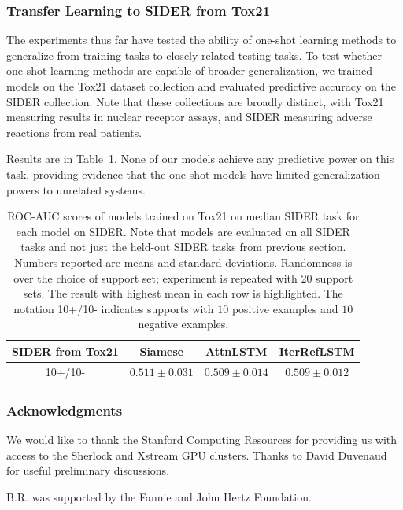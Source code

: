 \subsubsection{Transfer Learning to SIDER from Tox21}

The experiments thus far have tested the ability of one-shot learning methods to generalize from training tasks to closely related testing tasks. To test whether one-shot learning methods are capable of broader generalization, we trained models on the Tox21 dataset collection and evaluated predictive accuracy on the SIDER collection. Note that these collections are broadly distinct, with Tox21 measuring results in nuclear receptor assays, and SIDER measuring adverse reactions from real patients.

Results are in Table~\ref{tab:transfer}. None of our models achieve any predictive power on this task, providing evidence that the one-shot models have limited generalization powers to unrelated systems.

\begin{table}
    \centering
    \begin{tabular}{ |c|c|c|c| } 
    \hline
    SIDER from Tox21 & Siamese & AttnLSTM & IterRefLSTM \\ 
    \hline
    10+/10- & $0.511 \pm 0.031$ & $0.509 \pm 0.014$ & $0.509 \pm 0.012$ \\
    \hline
    \end{tabular}
    \caption{ROC-AUC scores of models trained on Tox21 on median SIDER task for each model on SIDER. Note that models are evaluated on all SIDER tasks and not just the held-out SIDER tasks from previous section. Numbers reported are means and standard deviations. Randomness is over the choice of support set; experiment is repeated with 20 support sets. The result with highest mean in each row is highlighted. The notation 10+/10- indicates supports with $10$ positive examples and $10$ negative examples.}
    \label{tab:transfer}
\end{table}


\clearpage

\subsubsection*{Acknowledgments}

We would like to thank the Stanford Computing Resources for providing us with access to the Sherlock and Xstream GPU clusters. Thanks to David Duvenaud for useful preliminary discussions.

B.R. was supported by the Fannie and John Hertz Foundation.
